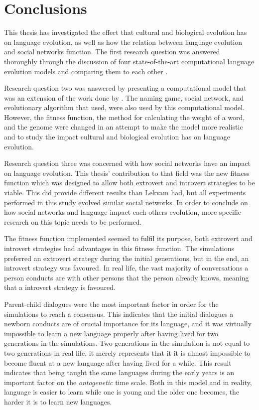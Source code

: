 \acresetall
\chapter{Conclusions}\label{ch:Conclusion}

This thesis has investigated the effect that cultural and biological evolution has on language evolution, as well as how the relation between language evolution and social networks function. The first research question was answered thoroughly through the discussion of four state-of-the-art computational language evolution models and comparing them to each other \citet{lipowska2011naming, lekvam2014co, gong2011simulating, munroe2002learning}. 

Research question two was answered by presenting a computational model that was an extension of the work done by \citeauthor{lekvam2014co}. The naming game, social network, and evolutionary algorithm that \citeauthor{lekvam2014co} used, were also used by this computational model. However, the fitness function, the method for calculating the weight of a word, and the genome were changed in an attempt to make the model more realistic and to study the impact cultural and biological evolution has on language evolution. 

Research question three was concerned with how social networks have an impact on language evolution. This thesis' contribution to that field was the new fitness function which was designed to allow both extrovert and introvert strategies to be viable. This did provide different results than Lekvam had, but all experiments performed in this study evolved similar social networks. In order to conclude on how social networks and language impact each others evolution, more specific research on this topic needs to be performed.
 
The fitness function implemented seemed to fulfil its purpose, both extrovert and introvert strategies had advantages in this fitness function. The simulations preferred an extrovert strategy during the initial generations, but in the end, an introvert strategy was favoured. In real life, the vast majority of conversations a person conducts are with other persons that the person already knows, meaning that a introvert strategy is favoured.
 
Parent-child dialogues were the most important factor in order for the simulations to reach a consensus. This indicates that the initial dialogues a newborn conducts are of crucial importance for its language, and it was virtually impossible to learn a new language properly after having lived for two generations in the simulations. Two generations in the simulation is not equal to two generations in real life, it merely represents that it it is almost impossible to become fluent at a new language after having lived for a while. This result indicates that being taught the same languages during the early years is an important factor on the \textit{ontogenetic} time scale. Both in this model and in reality, language is easier to learn while one is young and the older one becomes, the harder it is to learn new languages.
 
